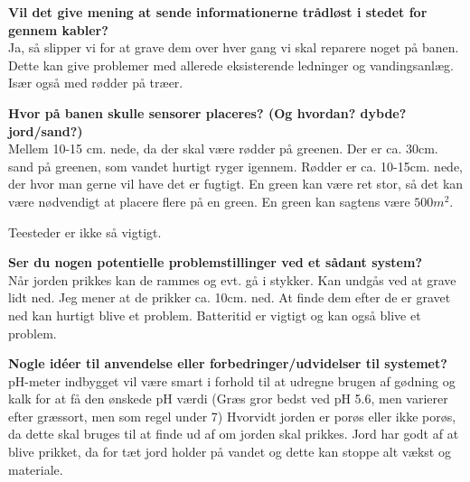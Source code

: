 \textbf{Vil det give mening at sende informationerne trådløst i stedet for gennem kabler?}\\
Ja, så slipper vi for at grave dem over hver gang vi skal reparere noget på banen. Dette kan give problemer med allerede eksisterende ledninger og vandingsanlæg. Især også med rødder på træer.

\textbf{Hvor på banen skulle sensorer placeres? (Og hvordan? dybde? jord/sand?)}\\
Mellem 10-15 cm. nede, da der skal være rødder på greenen. Der er ca. 30cm. sand på greenen, som vandet hurtigt ryger igennem. Rødder er ca. 10-15cm. nede, der hvor man gerne vil have det er fugtigt.
En green kan være ret stor, så det kan være nødvendigt at placere flere på en green. En green kan sagtens være $500m^2$.

Teesteder er ikke så vigtigt.

\textbf{Ser du nogen potentielle problemstillinger ved et sådant system?}\\
Når jorden prikkes kan de rammes og evt. gå i stykker. Kan undgås ved at grave lidt ned. Jeg mener at de prikker ca. 10cm. ned. 
At finde dem efter de er gravet ned kan hurtigt blive et problem. Batteritid er vigtigt og kan også blive et problem.

\textbf{Nogle idéer til anvendelse eller forbedringer/udvidelser til systemet?}\\
pH-meter indbygget vil være smart i forhold til at udregne brugen af gødning og kalk for at få den ønskede pH værdi (Græs gror bedst ved pH 5.6, men varierer efter græssort, men som regel under 7)
Hvorvidt jorden er porøs eller ikke porøs, da dette skal bruges til at finde ud af om jorden skal prikkes.
Jord har godt af at blive prikket, da for tæt jord holder på vandet og dette kan stoppe alt vækst og materiale.

